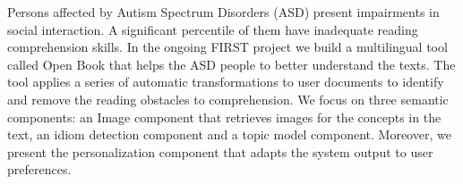 Persons affected by Autism Spectrum Disorders (ASD) present impairments in social
 interaction. A significant percentile of
 them have inadequate reading comprehension
 skills. In the ongoing FIRST project we build
 a multilingual tool called Open Book that
 helps the ASD people to better understand the
 texts. The tool applies a series of automatic
 transformations to user documents to identify
 and remove the reading obstacles to comprehension.
 We focus on three semantic components:
 an Image component that retrieves images
 for the concepts in the text, an idiom detection
 component and a topic model component.
 Moreover, we present the personalization
 component that adapts the system output
 to user preferences.

